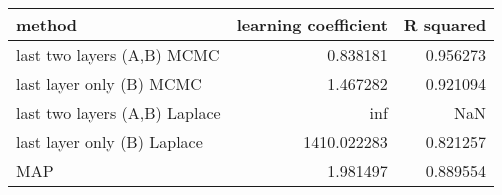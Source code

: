 \begin{tabular}{lrr}
\toprule
                        method &  learning coefficient &  R squared \\
\midrule
    last two layers (A,B) MCMC &              0.838181 &   0.956273 \\
      last layer only (B) MCMC &              1.467282 &   0.921094 \\
 last two layers (A,B) Laplace &                   inf &        NaN \\
   last layer only (B) Laplace &           1410.022283 &   0.821257 \\
                           MAP &              1.981497 &   0.889554 \\
\bottomrule
\end{tabular}
